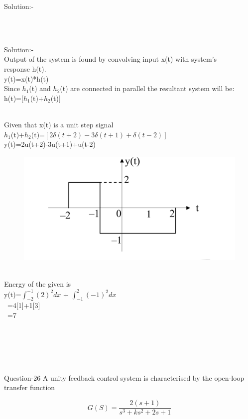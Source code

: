 \documentclass[journal,12pt,twocolumn]{IEEEtran}
\begin{document}
\begin{frame}{Solution:- }
\\\\
\begin{frame}{Solution:- }
\\ Output of the system is found by convolving input x(t) with system's \\response h(t).
\\y(t)=x(t)*h(t)
\\Since $h_1$(t) and $h_2$(t) are connected in parallel the resultant system will be:
\\ h(t)=[$h_1$(t)+$h_2$(t)]
\end{frame}
\begin{frame}{}
\\ Given that x(t) is a unit step signal
\\$h_1$(t)+$h_2$(t)=$[2\delta(t+2)-3\delta(t+1)+\delta(t-2)]$
\\y(t)=2u(t+2)-3u(t+1)+u(t-2)
\begin{figure}[h]
    \includegraphics[scale=0.15]{./figs/16.eps}
\end{figure}
\\Energy of the given is
\\y(t)=$\int_{-2}^{-1} (2)^2 dx$ + $\int_{-1}^{2} (-1)^2 dx$
\\\quad\  =4[1]+1[3]
\\\quad\ =7  
\\\\\\
\end{frame}
\\\\
\begin{frame}{Question-26 }
A unity feedback control system is characterised by the open-loop transfer function\\
\begin{centre}
$$
 G(S) = \frac{2(s+1)}{s^3 + ks^2 + 2s +1}
$$
\end{centre}


\end{frame}
\end{frame}
\end{document}
